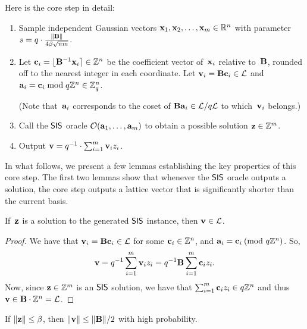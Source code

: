 \documentclass[11pt]{article}
\begin{document}
Here is the core step in detail:
\begin{enumerate}
\item Sample independent Gaussian vectors
  $\mathbf{x}_1, \mathbf{x}_2, \ldots, \mathbf{x}_{m} \in \mathbb{R}^{n}$ with parameter
  $s = q \cdot \frac{\lVert\mathbf{B}\rVert}{4 \beta \sqrt{n m}}$.

\item Let $\mathbf{c}_{i} = \lfloor\mathbf{B}^{-1} \mathbf{x}_{i}\rceil \in \mathbb{Z}^{n}$ be the
  coefficient vector of~$\mathbf{x}_{i}$ relative to~$\mathbf{B}$, rounded off
  to the nearest integer in each coordinate. Let
  $\mathbf{v}_{i} = \mathbf{B} \mathbf{c}_{i} \in \mathcal{L}$ and
  $\mathbf{a}_{i} = \mathbf{c}_{i} \bmod q\mathbb{Z}^{n} \in \mathbb{Z}_q^{n}$.

  (Note that~$\mathbf{a}_{i}$ corresponds to the coset of
  $\mathbf{B} \mathbf{a}_{i} \in \mathcal{L}/q\mathcal{L}$ to which~$\mathbf{v}_{i}$ belongs.)

\item Call the $\mathsf{SIS}$ oracle $\mathcal{O}(\mathbf{a}_{1}, \ldots, \mathbf{a}_{m})$ to
  obtain a possible solution $\mathbf{z} \in \mathbb{Z}^{m}$.

\item Output $\mathbf{v} = q^{-1} \cdot \sum_{i = 1}^{m} \mathbf{v}_{i} z_{i}$.
\end{enumerate}

In what follows, we present a few lemmas establishing the key
properties of this core step. The first two lemmas show that whenever
the $\mathsf{SIS}$ oracle outputs a solution, the core step outputs a lattice
vector that is significantly shorter than the current basis.

\begin{lemma}
  \label{lem:membership}
  If~$\mathbf{z}$ is a solution to the generated $\mathsf{SIS}$ instance, then
  $\mathbf{v} \in \mathcal{L}$.
\end{lemma}

\begin{proof}
  We have that $\mathbf{v}_{i} = \mathbf{B} \mathbf{c}_{i} \in \mathcal{L}$ for some
  $\mathbf{c}_{i} \in \mathbb{Z}^{n}$, and $\veca_{i} = \vecc_{i} \pmod*{q\Z^{n}}$.
  So,
  \[ \mathbf{v} = q^{-1} \sum_{i = 1}^{m} \mathbf{v}_{i} z_{i} = q^{-1} \mathbf{B}
    \sum_{i = 1}^{m} \mathbf{c}_{i} z_{i} . \] Now, since
  $\mathbf{z} \in \mathbb{Z}^{m}$ is an $\mathsf{SIS}$ solution, we have that
  $\sum_{i=1}^{m} \mathbf{c}_{i} z_{i} \in q\mathbb{Z}^{n}$ and thus
  $\mathbf{v} \in \mathbf{B}\cdot\mathbb{Z}^{n} = \mathcal{L}$.
\end{proof}

\begin{lemma}
  \label{lem:length-guarantee}
  If $\lVert\mathbf{z}\rVert \leq \beta$, then
  $\lVert\mathbf{v}\rVert \leq \lVert\mathbf{B}\rVert/2$ with high probability.
\end{lemma}
\end{document}
